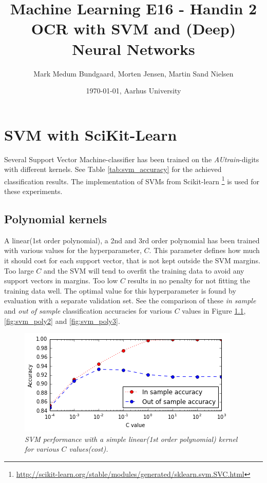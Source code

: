 \documentclass[a4paper,10pt,article,oneside,english]{memoir}
\let\oldcaption\caption
\renewcommand{\caption}[1]{\oldcaption{\emph{#1}}}
\begin{document}
	\title{Machine Learning E16 - Handin 2\\OCR with SVM and (Deep) Neural Networks}
	\author{Mark Medum Bundgaard, Morten Jensen, Martin Sand Nielsen}
	\date{\today, Aarhus University}
	
	\mainmatter
	\maketitle
	
	
	
	\chapter{SVM with SciKit-Learn}
	Several Support Vector Machine-classifier has been trained on the \emph{AUtrain}-digits with different kernels. See Table \ref{tab:svm_accuracy} for the achieved classification results. The implementation of SVMs from Scikit-learn  \footnote{ \url{http://scikit-learn.org/stable/modules/generated/sklearn.svm.SVC.html}}
	is used for these experiments.
	
	\section{Polynomial kernels}
	A linear(1st order polynomial), a 2nd and 3rd order polynomial has been trained with various values for the hyperparameter, $C$. This parameter defines how much it should cost for each support vector, that is not kept outside the SVM margins. Too large $C$ and the SVM will tend to overfit the training data to avoid any support vectors in margins. Too low $C$ results in no penalty for not fitting the training data well. The optimal value for this hyperparameter is found by evaluation with a separate validation set. See the comparison of these \emph{in sample} and \emph{out of sample} classification accuracies for various $C$ values in Figure \ref{fig:svm_lin}, \ref{fig:svm_poly2} and \ref{fig:svm_poly3}.
	
	\begin{figure}[h!]
		\centering
		\includegraphics[width=0.7\linewidth]{svm_lin.PNG}
		\caption{SVM performance with a simple linear(1st order polynomial) kernel for various $C$  values(cost).}
		\label{fig:svm_lin}
	\end{figure}
	
\end{document}
